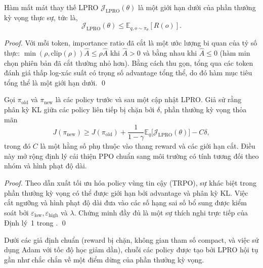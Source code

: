 \documentclass[11pt,a4paper]{article}
\begin{document}
\begin{lemma}\label{lem:monotonicity}
Hàm mất mát thay thế LPRO \(\mathcal{J}_{\text{LPRO}}(\theta)\) là một giới hạn dưới của phần thưởng kỳ vọng thực sự, tức là,
\[
\mathcal{J}_{\text{LPRO}}(\theta) \le \mathbb{E}_{q,o\sim\pi_\theta}[R(o)].
\]
\end{lemma}

\begin{proof}
Với mỗi token, importance ratio đã cắt là một ước lượng bi quan của tỷ số thực: \(\min(\rho,\text{clip}(\rho))\hat{A} \le \rho\hat{A}\) khi \(\hat{A}>0\) và bằng nhau khi \(\hat{A}\le0\) (hàm min chọn phiên bản đã cắt thường nhỏ hơn). Bằng cách thu gọn, tổng qua các token đánh giá thấp log-xác suất có trọng số advantage tổng thể, do đó hàm mục tiêu tổng thể là một giới hạn dưới. \qed
\end{proof}

\begin{lemma}\label{lem:improvement_bound}
Gọi \(\pi_{\text{old}}\) và \(\pi_{\text{new}}\) là các policy trước và sau một cập nhật LPRO. Giả sử rằng phân kỳ KL giữa các policy liên tiếp bị chặn bởi \(\delta\), phần thưởng kỳ vọng thỏa mãn
\[
J(\pi_{\text{new}}) \ge J(\pi_{\text{old}}) + \frac{1}{1-\gamma} \mathbb{E}_{q}\bigl[ \mathcal{J}_{\text{LPRO}}(\theta) \bigr] - C \delta,
\]
trong đó \(C\) là một hằng số phụ thuộc vào thang reward và các giới hạn cắt. Điều này mở rộng định lý cải thiện PPO chuẩn sang môi trường có tính tương đối theo nhóm và hình phạt độ dài.
\end{lemma}

\begin{proof}
Theo dẫn xuất tối ưu hóa policy vùng tin cậy (TRPO), sự khác biệt trong phần thưởng kỳ vọng có thể được giới hạn bởi advantage và phân kỳ KL. Việc cắt ngưỡng và hình phạt độ dài đưa vào các số hạng sai số bổ sung được kiểm soát bởi \(\varepsilon_{\text{low}},\varepsilon_{\text{high}}\) và \(\lambda\). Chứng minh đầy đủ là một sự thích nghi trực tiếp của Định lý~1 trong \citet{schulman2015trust}. \qed
\end{proof}

\begin{lemma}\label{lem:convergence}
Dưới các giả định chuẩn (reward bị chặn, không gian tham số compact, và việc sử dụng Adam với tốc độ học giảm dần), chuỗi các policy được tạo bởi LPRO hội tụ gần như chắc chắn về một điểm dừng của phần thưởng kỳ vọng.
\end{lemma}
\end{document}
